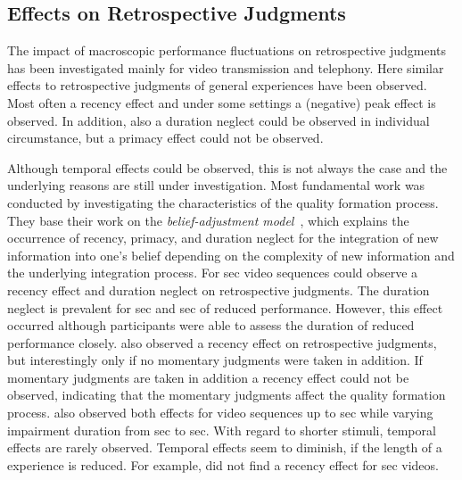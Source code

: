 \subsection{Effects on Retrospective Judgments}
The impact of macroscopic performance fluctuations on retrospective judgments has been investigated mainly for video transmission and telephony.
Here similar effects to retrospective judgments of general experiences have been observed.
Most often a recency effect and under some settings a (negative) peak effect is observed.
In addition, also a duration neglect could be observed in individual circumstance, but a primacy effect could not be observed.

Although temporal effects could be observed, this is not always the case and the underlying reasons are still under investigation.
Most fundamental work was conducted by \citet{hands_recency_2001} investigating the characteristics of the quality formation process.
They base their work on the \emph{belief-adjustment model}~\citep{hogarth_order_1992}, which explains the occurrence of recency, primacy, and duration neglect for the integration of new information into one's belief depending on the complexity of new information and the underlying integration process.
For \unit[30]{sec} video sequences \citet{hands_recency_2001} could observe a recency effect and duration neglect on retrospective judgments.
The duration neglect is prevalent for \unit[5]{sec} and \unit[10]{sec} of reduced performance.
However, this effect occurred although participants were able to assess the duration of reduced performance closely. %
\citet{hands_recency_2001} also observed a recency effect on retrospective judgments, but interestingly only if no momentary judgments were taken in addition.
If momentary judgments are taken in addition a recency effect could not be observed, indicating that the momentary judgments affect the quality formation process.
\citet{hamberg_time-varying_1999} also observed both effects for video sequences up to \unit[180]{sec} while varying impairment duration from \unit[2]{sec} to \unit[10]{sec}.
With regard to shorter stimuli, temporal effects are rarely observed.
Temporal effects seem to diminish, if the length of a experience is reduced.
For example, \citet{ninassi_considering_2009} did not find a recency effect for \unit[8]{sec} videos.


